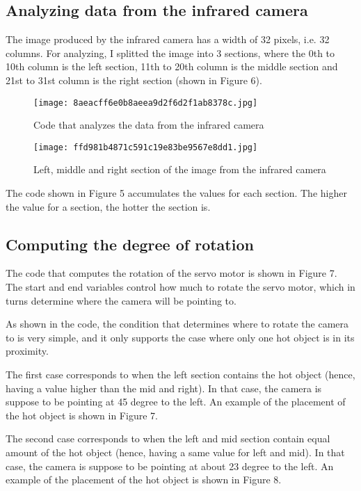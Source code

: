 \documentclass[12pt]{article}
\begin{document}
\subsection {Analyzing data from the infrared camera}

The image produced by the infrared camera has a width of 32 pixels, i.e. 32 columns. For analyzing, I splitted the image into 3 sections, where the 0th to 10th column is the left section, 11th to 20th column is the middle section and 21st to 31st column is the right section (shown in Figure 6).

\begin{figure}[h]
\texttt{[image: 8aeacff6e0b8aeea9d2f6d2f1ab8378c.jpg]}
\centering
\caption{Code that analyzes the data from the infrared camera}
\end{figure}

\begin{figure}[h]
\texttt{[image: ffd981b4871c591c19e83be9567e8dd1.jpg]}
\centering
\caption{Left, middle and right section of the image from the infrared camera}
\end{figure}

The code shown in Figure 5 accumulates the values for each section. The higher the value for a section, the hotter the section is.

\subsection {Computing the degree of rotation}

The code that computes the rotation of the servo motor is shown in Figure 7. The start and end variables control how much to rotate the servo motor, which in turns determine where the camera will be pointing to.

As shown in the code, the condition that determines where to rotate the camera to is very simple, and it only supports the case where only one hot object is in its proximity.

The first case corresponds to when the left section contains the hot object (hence, having a value higher than the mid and right). In that case, the camera is suppose to be pointing at 45 degree to the left. An example of the placement of the hot object is shown in Figure 7.

The second case corresponds to when the left  and mid section contain equal amount of the hot object (hence, having a same value for left and mid). In that case, the camera is suppose to be pointing at about 23 degree to the left. An example of the placement of the hot object is shown in Figure 8. 
\end{document}
